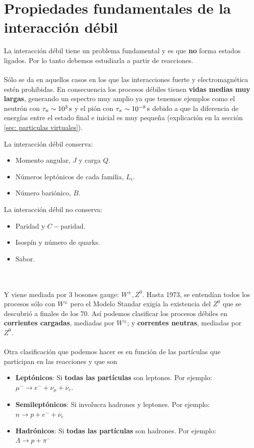 \section{Propiedades fundamentales de la interacción débil}
La interacción débil tiene un problema fundamental y es que \textbf{no} forma estados ligados. Por lo tanto debemos estudiarla a partir de reacciones.\\\\ Sólo se da en aquellos casos en los que las interacciones fuerte y electromagnética estén prohibidas. En consecuencia los procesos débiles tienen \textbf{vidas medias muy largas}, generando un espectro muy amplio ya que tenemos ejemplos como el neutrón con $\tau_n \sim \unit[10^3]{s}$ y el pión con $\tau_\pi \sim \unit[10^{-8}]{s}$ debido a que la diferencia de energías entre el estado final e inicial es muy pequeña (explicación en la sección \ref{sec: particulas virtuales}).
\newpage
\noindent
\begin{minipage}{0.5\linewidth}
    La interacción débil conserva:
\begin{itemize}
    \item Momento angular, $J$ y carga $Q$.
    \item Números leptónicos de cada familia, $L_i$.
    \item Número bariónico, $B$.
\end{itemize}
\end{minipage}
\hfill
\begin{minipage}{0.4\linewidth}
    La interacción débil no conserva:
    \begin{itemize}
        \item Paridad y $C-$paridad.
        \item Isospín y número de quarks.
        \item Sabor.
    \end{itemize}
\end{minipage}\\\\

Y viene mediada por 3 bosones gauge: $W^\pm, Z^0$. Hasta 1973, se entendían todos los procesos sólo con $W^\pm$ pero el Modelo Standar exigía la existencia del $Z^0$ que se descubrió a finales de los 70. Así podemos clasificar los procesos débiles en \textbf{corrientes cargadas}, mediadas por $W^\pm$; y \textbf{correntes neutras}, mediadas por $Z^0$.\\\\
Otra clasificación que podemos hacer es en función de las partículas que participan en las reacciones y que son
\begin{itemize}
    \item \textbf{Leptónicos}: Si \textbf{todas las partículas} son leptones. Por ejemplo: $\mu^- \longrightarrow e^- +\nu_\mu + \overline{\nu}_e$.
    \item \textbf{Semileptónicos}: Si involucra hadrones y leptones. Por ejemplo: $n \longrightarrow p+ e^-  + \overline{\nu}_e$
    \item \textbf{Hadrónicos}: Si \textbf{todas las partículas} son hadrones. Por ejemplo: $\Lambda \longrightarrow p +\pi^-$
\end{itemize}
